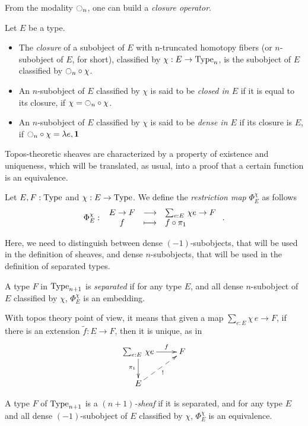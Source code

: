 From the modality $\ocircle_n$, one can build a {\em closure operator}.

\begin{defi}
  Let $E$ be a type. 
  \begin{itemize}

  \item The {\em closure} of a subobject of $E$ with
  n-truncated homotopy fibers (or $n$-subobject of $E$, for short),
  classified by $\chi : E \to \operatorname{Type}_n$, is the subobject of $E$
  classified by $\ocircle_n \circ \chi$.

  
\item An $n$-subobject of $E$ classified by $\chi$ is said to be {\em
    closed in $E$} if it is equal to its closure, \ie{} if
  $\chi = \ocircle_n \circ \chi$.

  
\item An $n$-subobject of $E$ classified by $\chi$ is said to be {\em
    dense in $E$} if its closure is $E$, \ie{} if 
  $\ocircle_n \circ \chi = \lambda e, \mathbf{1}$ 
  \end{itemize}
\end{defi}


Topos-theoretic sheaves are characterized by a property of existence
and uniqueness, which will be translated, as usual, into a proof that
a certain function is an equivalence.

\begin{defi}[Restriction]
  Let $E,F:\operatorname{Type}$ and $\chi:E\to\operatorname{Type}$. We define the {\em
    restriction map} $\Phi_E^\chi$ as follows
  \[
    \Phi_E^\chi \, \colon \left. \begin{array}{ccl} E\to F & \longrightarrow & \sum_{e:E}\, \chi e \to F \\ f & \longmapsto & f\circ \pi_1 \end{array} \right..
  \]
\end{defi}

Here, we need to distinguish between
dense $(-1)$-subobjects, that will be used in the definition of
sheaves, and dense $n$-subobjects, that will be used in the definition
of separated types. 

\begin{defi}
  A type $F$ in $\operatorname{Type}_{n+1}$ is {\em separated} if for any type $E$, and
  all dense $n$-subobject of $E$ classified by $\chi$,
  $\Phi_E^\chi$ is an embedding.
\end{defi}

With topos theory point of view, it means that given a map $\sum_{e:E}
\chi\, e \to F$,
if there is an extension $\tilde f:E\to F$, then it is unique, as in
 \[ \xymatrix{
    \sumD e E {\chi e} \ar[r]^-f \ar[d]_{\pi_1} & F \\
    E \ar@{-->}[ru]_{!}&
  }\]
\begin{defi}[Sheaf]
  A type $F$ of $\operatorname{Type}_{n+1}$ is a {\em $(n+1)$-sheaf} if it is
  separated, and for any type $E$ and all dense $(-1)$-subobject of
  $E$ classified by $\chi$, $\Phi_E^\chi$ is an
  equivalence.
\end{defi}


